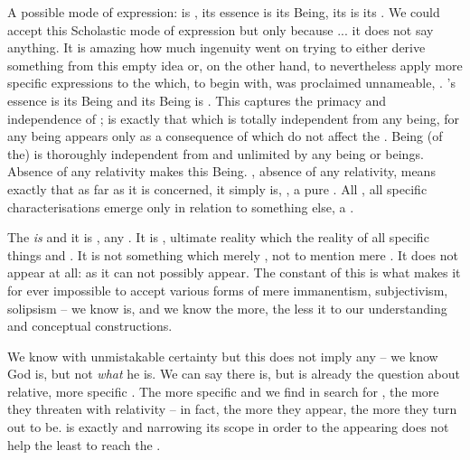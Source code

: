 A possible mode of expression:   is ,
its essence is its Being, its  is its .
We could accept this Scholastic mode of expression but only because ... it does
not say anything. It is amazing how much ingenuity went on trying to either
derive something from this empty idea or, on the other hand, to nevertheless
apply more specific expressions to the  which, to begin with, was
proclaimed unnameable, .  's essence is its
Being and its Being is . This  captures the
primacy and independence of ;  is exactly that which
is totally independent from any being, for any being appears only as a
consequence of  which do not affect the .  Being
(of the)  is thoroughly independent from and unlimited by any
being or beings. Absence of any relativity makes this 
Being. , absence of any relativity, means
exactly that as far as it is concerned, it simply is, , a pure . All , all specific characterisations
emerge only in relation to something else, a .


\pa\label{nothingtoknow} The  {\em is} and it is  
,  any . It is , ultimate
reality which  the reality of all specific things and
.  It is not something which merely , not to
mention mere . It does not appear at all: as
 it can not possibly appear.  The constant  of this
 is what makes it for ever impossible to accept various
forms of mere immanentism, subjectivism, solipsism -- we know  is, and
we know  the more, the less it  to our understanding and
conceptual constructions.

We know  with unmistakable certainty but this does not imply any
 -- we know  God is, but not {\em what} he is. We can say
 there is, but  is already the question about relative,
more specific .  The more specific and  
we find in search for , the more they threaten with relativity
-- in fact, the more  they appear, the more  they
turn out to be.   is exactly  and narrowing its
scope in order to  the appearing  does not help the
least to reach the .

